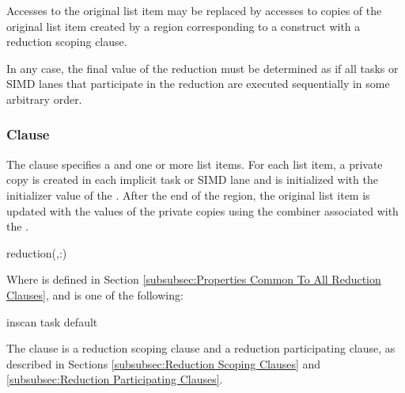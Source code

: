 Accesses to the original list item may be replaced by accesses to copies of the
original list item created by a region corresponding to a construct with a
reduction scoping clause.

In any case, the final value of the reduction must be determined as if all tasks
or SIMD lanes that participate in the reduction are executed sequentially in
some arbitrary order.










\subsubsection{ Clause}
\label{subsubsec:reduction clause}
\summary
The  clause specifies a  and one or
more list items. For each list item, a private copy is created in each implicit
task or SIMD lane and is initialized with the initializer value of the
. After the end of the region, the original list item
is updated with the values of the private copies using the combiner associated
with the .

\syntax
\begin{ompSyntax}
reduction(\plc{[ reduction-modifier},\plc{]reduction-identifier }:)
\end{ompSyntax}

Where  is defined in Section
\ref{subsubsec:Properties Common To All Reduction Clauses}, and
 is one of the following:
\begin{indentedcodelist}
inscan
task
default
\end{indentedcodelist}

\descr
The  clause is a reduction scoping clause and a reduction
participating clause, as described in Sections \ref{subsubsec:Reduction Scoping
Clauses} and \ref{subsubsec:Reduction Participating Clauses}. 

